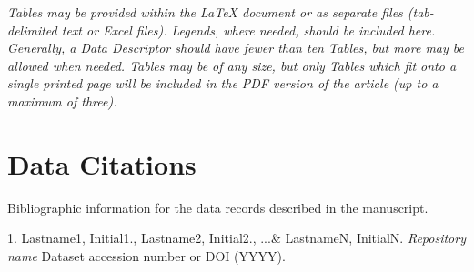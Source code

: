 \documentclass[english]{article}
\begin{document}
\emph{Tables may be provided within the \LaTeX{} document or as separate
files (tab-delimited text or Excel files). Legends, where needed,
should be included here. Generally, a Data Descriptor should have
fewer than ten Tables, but more may be allowed when needed. Tables
may be of any size, but only Tables which fit onto a single printed
page will be included in the PDF version of the article (up to a maximum
of three).}

{\small
}

%
%

\section*{Data Citations}

Bibliographic information for the data records described in the manuscript.

1. Lastname1, Initial1., Lastname2, Initial2., ...\& LastnameN, InitialN. \emph{Repository name} Dataset accession number or DOI (YYYY).
\end{document}
